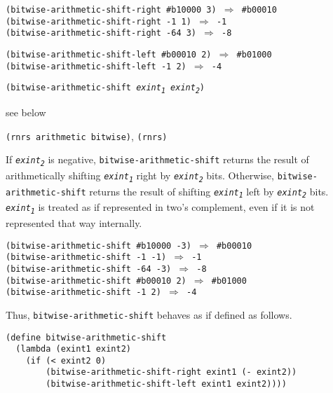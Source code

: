 \begin{alltt}
(bitwise-arithmetic-shift-right \#{}b10000 3) \(\Rightarrow\) \#{}b00010
(bitwise-arithmetic-shift-right -1 1) \(\Rightarrow\) -1
(bitwise-arithmetic-shift-right -64 3) \(\Rightarrow\) -8

(bitwise-arithmetic-shift-left \#{}b00010 2) \(\Rightarrow\) \#{}b01000
(bitwise-arithmetic-shift-left -1 2) \(\Rightarrow\) -4
\end{alltt}

\begin{description}

\label{objects_s144}\item[procedure] \texttt{(bitwise-arithmetic-shift \textit{exint\textsubscript{1}} \textit{exint\textsubscript{2}})}



\item[returns] see below


\item[libraries] \texttt{(rnrs arithmetic bitwise)}, \texttt{(rnrs)}
\end{description}


If \texttt{\textit{exint\textsubscript{2}}} is negative, \texttt{bitwise-arithmetic-shift} returns the
result of arithmetically shifting \texttt{\textit{exint\textsubscript{1}}} right by \texttt{\textit{exint\textsubscript{2}}} bits.
Otherwise, \texttt{bitwise-arithmetic-shift} returns the
result of shifting \texttt{\textit{exint\textsubscript{1}}} left by \texttt{\textit{exint\textsubscript{2}}} bits.
\texttt{\textit{exint\textsubscript{1}}} is treated as if represented in two's complement, even
if it is not represented that way internally.


\begin{alltt}
(bitwise-arithmetic-shift \#{}b10000 -3) \(\Rightarrow\) \#{}b00010
(bitwise-arithmetic-shift -1 -1) \(\Rightarrow\) -1
(bitwise-arithmetic-shift -64 -3) \(\Rightarrow\) -8
(bitwise-arithmetic-shift \#{}b00010 2) \(\Rightarrow\) \#{}b01000
(bitwise-arithmetic-shift -1 2) \(\Rightarrow\) -4
\end{alltt}


Thus, \texttt{bitwise-arithmetic-shift} behaves as if defined as follows.


\begin{alltt}
(define bitwise-arithmetic-shift
  (lambda (exint1 exint2)
    (if (\textless{} exint2 0)
        (bitwise-arithmetic-shift-right exint1 (- exint2))
        (bitwise-arithmetic-shift-left exint1 exint2))))
\end{alltt}

